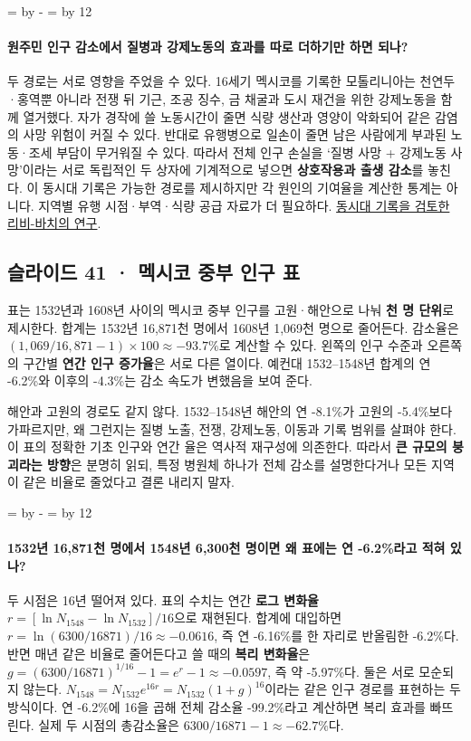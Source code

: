 \documentclass[10pt,a4paper]{article}
\newcommand{\ReserveQuestionSpace}{%
  \par\begingroup
  \dimen0=\pagegoal \advance\dimen0 by -\pagetotal
  \dimen2=\baselineskip \multiply\dimen2 by 12
  \ifdim\dimen0<\dimen2 \newpage\fi
  \endgroup}
\begin{document}
\ReserveQuestionSpace
\paragraph{원주민 인구 감소에서 질병과 강제노동의 효과를 따로 더하기만 하면 되나?}
두 경로는 서로 영향을 주었을 수 있다. 16세기 멕시코를 기록한 모톨리니아는 천연두·홍역뿐 아니라 전쟁 뒤 기근, 조공 징수, 금 채굴과 도시 재건을 위한 강제노동을 함께 열거했다. 자가 경작에 쓸 노동시간이 줄면 식량 생산과 영양이 악화되어 같은 감염의 사망 위험이 커질 수 있다. 반대로 유행병으로 일손이 줄면 남은 사람에게 부과된 노동·조세 부담이 무거워질 수 있다. 따라서 전체 인구 손실을 ‘질병 사망 + 강제노동 사망’이라는 서로 독립적인 두 상자에 기계적으로 넣으면 \textbf{상호작용과 출생 감소}를 놓친다. 이 동시대 기록은 가능한 경로를 제시하지만 각 원인의 기여율을 계산한 통계는 아니다. 지역별 유행 시점·부역·식량 공급 자료가 더 필요하다. \href{https://labdisia.disia.unifi.it/livi/pubblicazioni/depopulation-of-hispanic-america.pdf}{동시대 기록을 검토한 리비-바치의 연구}.\par

\subsection{슬라이드 41 · 멕시코 중부 인구 표}
표는 1532년과 1608년 사이의 멕시코 중부 인구를 고원·해안으로 나눠 \textbf{천 명 단위}로 제시한다. 합계는 1532년 16,871천 명에서 1608년 1,069천 명으로 줄어든다. 감소율은 $(1,069/16,871-1)\times100\approx-93.7\%$로 계산할 수 있다. 왼쪽의 인구 수준과 오른쪽의 구간별 \textbf{연간 인구 증가율}은 서로 다른 열이다. 예컨대 1532–1548년 합계의 연 -6.2\%와 이후의 -4.3\%는 감소 속도가 변했음을 보여 준다.\par

해안과 고원의 경로도 같지 않다. 1532–1548년 해안의 연 -8.1\%가 고원의 -5.4\%보다 가파르지만, 왜 그런지는 질병 노출, 전쟁, 강제노동, 이동과 기록 범위를 살펴야 한다. 이 표의 정확한 기초 인구와 연간 율은 역사적 재구성에 의존한다. 따라서 \textbf{큰 규모의 붕괴라는 방향}은 분명히 읽되, 특정 병원체 하나가 전체 감소를 설명한다거나 모든 지역이 같은 비율로 줄었다고 결론 내리지 말자.\par

\ReserveQuestionSpace
\paragraph{1532년 16,871천 명에서 1548년 6,300천 명이면 왜 표에는 연 -6.2\%라고 적혀 있나?}
두 시점은 16년 떨어져 있다. 표의 수치는 연간 \textbf{로그 변화율} $r=[\ln N_{1548}-\ln N_{1532}]/16$으로 재현된다. 합계에 대입하면 $r=\ln(6300/16871)/16\approx-0.0616$, 즉 연 -6.16\%를 한 자리로 반올림한 -6.2\%다. 반면 매년 같은 비율로 줄어든다고 쓸 때의 \textbf{복리 변화율}은 $g=(6300/16871)^{1/16}-1=e^r-1\approx-0.0597$, 즉 약 -5.97\%다. 둘은 서로 모순되지 않는다. $N_{1548}=N_{1532}e^{16r}=N_{1532}(1+g)^{16}$이라는 같은 인구 경로를 표현하는 두 방식이다. 연 -6.2\%에 16을 곱해 전체 감소율 -99.2\%라고 계산하면 복리 효과를 빠뜨린다. 실제 두 시점의 총감소율은 $6300/16871-1\approx-62.7\%$다.\par
\end{document}

